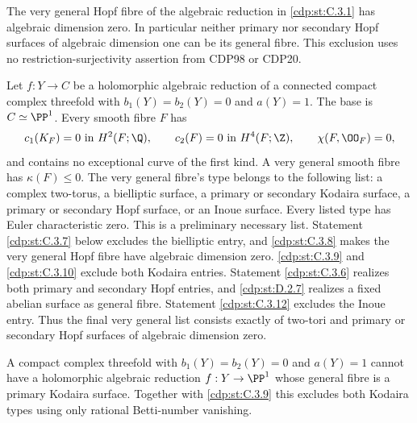 
\begin{proposition}\hypertarget{tag-01FE}{}\label{cdp:st:C.3.8}



The very general Hopf fibre of the algebraic reduction in \ref{cdp:st:C.3.1}
has algebraic dimension zero. In particular neither primary nor
secondary Hopf surfaces of algebraic dimension one can be its
general fibre. This exclusion uses no restriction-surjectivity
assertion from CDP98 or CDP20.
\end{proposition}

\begin{proposition}\hypertarget{tag-01F4}{}\label{cdp:st:C.3.1}


Let $f:Y\to C$ be a holomorphic algebraic reduction of a connected
compact complex threefold with $b_1(Y)=b_2(Y)=0$ and $a(Y)=1$.
The base is $C\simeq\PP^1$. Every smooth fibre $F$ has
\[
 c_1(K_F)=0\text{ in }H^2(F;\Q),\qquad
 c_2(F)=0\text{ in }H^4(F;\Z),\qquad
 \chi(F,\OO_F)=0,
\]
and contains no exceptional curve of the first kind. A very general
smooth fibre has $\kappa(F)\leq0$. The very general fibre's type belongs to the following
list: a complex two-torus, a bielliptic surface, a primary or secondary
Kodaira surface, a primary or secondary Hopf surface, or an Inoue
surface. Every listed type has Euler characteristic zero. This is a
preliminary necessary list. Statement \ref{cdp:st:C.3.7} below excludes the
bielliptic entry, and \ref{cdp:st:C.3.8} makes the very general Hopf fibre have
algebraic dimension zero. \ref{cdp:st:C.3.9} and \ref{cdp:st:C.3.10} exclude both Kodaira
entries. Statement \ref{cdp:st:C.3.6} realizes both primary and secondary Hopf
entries, and \ref{cdp:st:D.2.7} realizes a fixed abelian surface as general
fibre. Statement \ref{cdp:st:C.3.12} excludes the Inoue entry. Thus the
final very general list consists exactly of two-tori and
primary or secondary Hopf surfaces of algebraic dimension zero.
\end{proposition}

\begin{proposition}\hypertarget{tag-01F5}{}\label{cdp:st:C.3.10}



A compact complex threefold with $b_1(Y)=b_2(Y)=0$ and
$a(Y)=1$ cannot have a holomorphic algebraic reduction
$f:Y\to\PP^1$ whose general fibre is a primary Kodaira
surface. Together with \ref{cdp:st:C.3.9} this excludes both Kodaira
types using only rational Betti-number vanishing.
\end{proposition}

